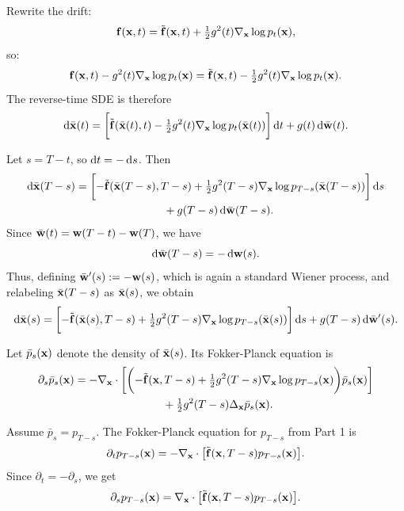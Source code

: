Rewrite the drift:
\[
{\mathbf{f}}({\mathbf{x}}, t) = \tilde {{\mathbf{f}}}({\mathbf{x}}, t) + \tfrac{1}{2} g^2(t) \nabla_{{\mathbf{x}}} \log p_t({\mathbf{x}}),
\]
so:
\[
{\mathbf{f}}({\mathbf{x}}, t) - g^2(t) \nabla_{{\mathbf{x}}} \log p_t({\mathbf{x}})
= \tilde {{\mathbf{f}}}({\mathbf{x}}, t) - \tfrac{1}{2} g^2(t) \nabla_{{\mathbf{x}}} \log p_t({\mathbf{x}}).
\]
The reverse-time SDE is therefore
\[
\mathop{}\!\mathrm{d} \bar{{\mathbf{x}}}(t)
=
\biggl[
\tilde {{\mathbf{f}}}(\bar{{\mathbf{x}}}(t), t)
- \tfrac{1}{2} g^2(t)\nabla_{{\mathbf{x}}}\log p_t(\bar{{\mathbf{x}}}(t))
\biggr]\mathop{}\!\mathrm{d} t
+ g(t)\mathop{}\!\mathrm{d} \bar{{\mathbf{w}}}(t).
\]

Let $s = T - t$, so $\mathop{}\!\mathrm{d} t = -\mathop{}\!\mathrm{d} s$. Then
\begin{align*}
\mathop{}\!\mathrm{d} \bar{{\mathbf{x}}}(T - s)
&=
\biggl[
-\tilde {{\mathbf{f}}}(\bar{{\mathbf{x}}}(T - s), T - s)
+ \tfrac{1}{2} g^2(T - s)\nabla_{{\mathbf{x}}}\log p_{T-s}(\bar{{\mathbf{x}}}(T - s))
\biggr]\mathop{}\!\mathrm{d} s \\
&\qquad\qquad\qquad\qquad
+ g(T - s)\mathop{}\!\mathrm{d} \bar{{\mathbf{w}}}(T - s).
\end{align*}
Since $\bar{{\mathbf{w}}}(t) = {\mathbf{w}}(T - t) - {\mathbf{w}}(T)$, we have
\[
\mathop{}\!\mathrm{d} \bar{{\mathbf{w}}}(T - s) = -\mathop{}\!\mathrm{d} {\mathbf{w}}(s).
\]
Thus, defining $\bar{{\mathbf{w}}}'(s) := -{\mathbf{w}}(s)$, which is again a standard Wiener process, and relabeling $\bar{{\mathbf{x}}}(T-s)$ as $\bar{{\mathbf{x}}}(s)$, we obtain
\[
\mathop{}\!\mathrm{d} \bar{{\mathbf{x}}}(s)
=
\biggl[
-\tilde {{\mathbf{f}}}(\bar{{\mathbf{x}}}(s), T - s)
+ \tfrac{1}{2} g^2(T - s)\nabla_{{\mathbf{x}}}\log p_{T-s}(\bar{{\mathbf{x}}}(s))
\biggr]\mathop{}\!\mathrm{d} s
+ g(T - s)\mathop{}\!\mathrm{d} \bar{{\mathbf{w}}}'(s).
\]

Let $\bar p_s({\mathbf{x}})$ denote the density of $\bar{{\mathbf{x}}}(s)$. Its Fokker-Planck equation is
\begin{align*}
\partial_s \bar p_s({\mathbf{x}})
&=
-\nabla_{{\mathbf{x}}}\cdot
\biggl[
\biggl(
-\tilde {{\mathbf{f}}}({\mathbf{x}}, T - s)
+ \tfrac{1}{2} g^2(T - s)\nabla_{{\mathbf{x}}}\log p_{T-s}({\mathbf{x}})
\biggr)\bar p_s({\mathbf{x}})
\biggr] \\
&\qquad\qquad\qquad\qquad
+ \tfrac{1}{2} g^2(T - s)\Delta_{{\mathbf{x}}}\bar p_s({\mathbf{x}}).
\end{align*}

Assume $\bar p_s = p_{T-s}$. The Fokker-Planck equation for $p_{T-s}$ from Part 1 is
\[
\partial_t p_{T-s}({\mathbf{x}})
=
-\nabla_{{\mathbf{x}}}\cdot\bigl[\tilde {{\mathbf{f}}}({\mathbf{x}}, T - s)p_{T-s}({\mathbf{x}})\bigr].
\]
Since $\partial_t = -\partial_s$, we get
\[
\partial_s p_{T-s}({\mathbf{x}})
=
\nabla_{{\mathbf{x}}}\cdot\bigl[\tilde {{\mathbf{f}}}({\mathbf{x}}, T - s)p_{T-s}({\mathbf{x}})\bigr].
\]

